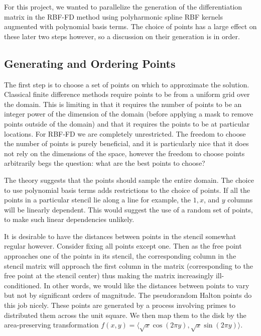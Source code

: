 \documentclass[12pt]{article}
\begin{document}
	For this project, we wanted to parallelize the generation of the differentiation matrix in the RBF-FD method using polyharmonic spline RBF kernels augmented with polynomial basis terms. The choice of points has a large effect on these later two steps however, so a discussion on their generation is in order.

\subsection{Generating and Ordering Points}
The first step is to choose a set of points on which to approximate the solution. Classical finite difference methods require points to be from a uniform grid over the domain. This is limiting in that it requires the number of points to be an integer power of the dimension of the domain (before applying a mask to remove points outside of the domain) and that it requires the points to be at particular locations. For RBF-FD we are completely unrestricted. The freedom to choose the number of points is purely beneficial, and it is particularly nice that it does not rely on the dimensions of the space, however the freedom to choose points arbitrarily begs the question: what are the best points to choose?

The theory suggests that the points should sample the entire domain. The choice to use polynomial basis terms adds restrictions to the choice of points. If all the points in a particular stencil lie along a line for example, the $1, x$, and $y$ columns will be linearly dependent. This would suggest the use of a random set of points, to make such linear dependencies unlikely. 

It is desirable to have the distances between points in the stencil somewhat regular however. Consider fixing all points except one. Then as the free point approaches one of the points in its stencil, the corresponding column in the stencil matrix will approach the first column in the matrix (corresponding to the free point at the stencil center) thus making the matrix increasingly ill-conditioned. In other words, we would like the distances between points to vary but not by significant orders of magnitude. The pseudorandom Halton points\cite{Halton1960} do this job nicely. These points are generated by a process involving primes to distributed them across the unit square. We then map them to the disk by the area-preserving transformation $f(x, y) = \langle \sqrt{x}\cos(2\pi y), \sqrt{x}\sin(2 \pi y) \rangle$.
\end{document}
